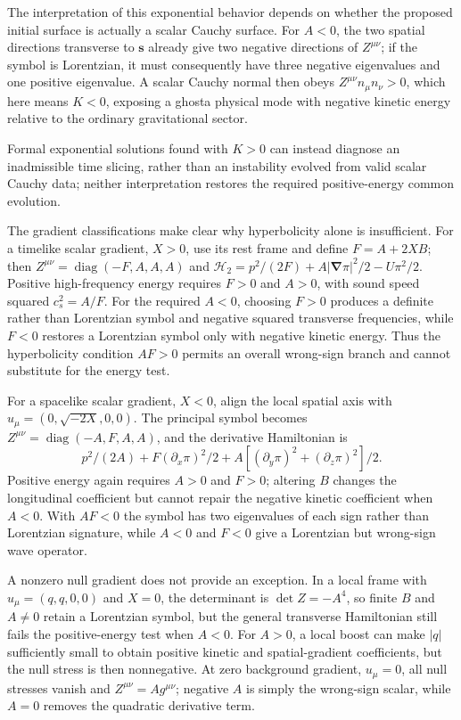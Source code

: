 \documentclass[11pt]{article}
\begin{document}
The interpretation of this exponential behavior depends on whether the proposed initial surface is actually a scalar Cauchy surface. For $A<0$, the two spatial directions transverse to $\mathbf s$ already give two negative directions of $Z^{\mu\nu}$; if the symbol is Lorentzian, it must consequently have three negative eigenvalues and one positive eigenvalue. A scalar Cauchy normal then obeys $Z^{\mu\nu}n_\mu n_\nu>0$, which here means $K<0$, exposing a ghost\textemdash{}a physical mode with negative kinetic energy relative to the ordinary gravitational sector.

Formal exponential solutions found with $K>0$ can instead diagnose an inadmissible time slicing, rather than an instability evolved from valid scalar Cauchy data; neither interpretation restores the required positive-energy common evolution.

The gradient classifications make clear why hyperbolicity alone is insufficient. For a timelike scalar gradient, $X>0$, use its rest frame and define $F=A+2XB$; then $Z^{\mu\nu}=\operatorname{diag}(-F,A,A,A)$ and $\mathcal H_2=p^2/(2F)+A|\boldsymbol\nabla\pi|^2/2-U\pi^2/2$. Positive high-frequency energy requires $F>0$ and $A>0$, with sound speed squared $c_s^2=A/F$. For the required $A<0$, choosing $F>0$ produces a definite rather than Lorentzian symbol and negative squared transverse frequencies, while $F<0$ restores a Lorentzian symbol only with negative kinetic energy. Thus the hyperbolicity condition $AF>0$ permits an overall wrong-sign branch and cannot substitute for the energy test.

For a spacelike scalar gradient, $X<0$, align the local spatial axis with $u_\mu=(0,\sqrt{-2X},0,0)$. The principal symbol becomes $Z^{\mu\nu}=\operatorname{diag}(-A,F,A,A)$, and the derivative Hamiltonian is \[p^2/(2A)+F(\partial_x\pi)^2/2+A[(\partial_y\pi)^2+(\partial_z\pi)^2]/2.\] Positive energy again requires $A>0$ and $F>0$; altering $B$ changes the longitudinal coefficient but cannot repair the negative kinetic coefficient when $A<0$. With $AF<0$ the symbol has two eigenvalues of each sign rather than Lorentzian signature, while $A<0$ and $F<0$ give a Lorentzian but wrong-sign wave operator.

A nonzero null gradient does not provide an exception. In a local frame with $u_\mu=(q,q,0,0)$ and $X=0$, the determinant is $\det Z=-A^4$, so finite $B$ and $A\ne0$ retain a Lorentzian symbol, but the general transverse Hamiltonian still fails the positive-energy test when $A<0$. For $A>0$, a local boost can make $|q|$ sufficiently small to obtain positive kinetic and spatial-gradient coefficients, but the null stress is then nonnegative. At zero background gradient, $u_\mu=0$, all null stresses vanish and $Z^{\mu\nu}=A g^{\mu\nu}$; negative $A$ is simply the wrong-sign scalar, while $A=0$ removes the quadratic derivative term.
\end{document}
